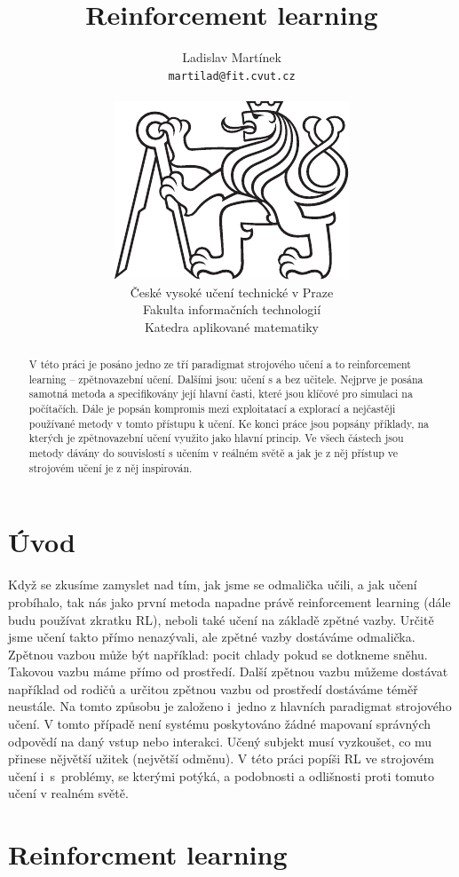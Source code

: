 \documentclass{article}
\title{Reinforcement learning}
\author{
  Ladislav Martínek\\
  \texttt{martilad@fit.cvut.cz} \\
  \\
  \includegraphics[width=.16\textwidth]{./img/cvut-logo-bw}
  \\
  České vysoké učení technické v Praze\\
  Fakulta informačních technologií\\
  Katedra aplikované matematiky\\  
}
\begin{document}
\maketitle

\begin{abstract}
V této práci je posáno jedno ze tří paradigmat strojového učení a to reinforcement learning -- zpětnovazební učení. Dalšími jsou: učení s a bez učitele. Nejprve je posána samotná metoda a specifikovány její hlavní časti, které jsou klíčové pro simulaci na počítačích. Dále je popsán kompromis mezi exploitatací a explorací a nejčastěji používané metody v tomto přístupu k učení. Ke konci práce jsou popsány příklady, na kterých je zpětnovazební učení využito jako hlavní princip. Ve všech částech jsou metody dávány do souvislostí s učením v reálném světě a jak je z něj přístup ve strojovém učení je z něj inspirován.
\end{abstract}




\section{Úvod}
Když se zkusíme zamyslet nad tím, jak jsme se odmalička učili, a jak učení probíhalo, tak nás jako první metoda napadne právě reinforcement learning (dále budu používat zkratku RL), neboli také učení na základě zpětné vazby. Určitě jsme učení takto přímo nenazývali, ale zpětné vazby dostáváme odmalička. Zpětnou vazbou může být například: pocit chlady pokud se dotkneme sněhu. Takovou vazbu máme přímo od prostředí. Další zpětnou vazbu můžeme dostávat například od rodičů a určitou zpětnou vazbu od prostředí dostáváme téměř neustále. Na tomto způsobu je založeno i~jedno z hlavních paradigmat strojového učení. V tomto případě není systému poskytováno žádné mapovaní správných odpovědí na daný vstup nebo interakci. Učený subjekt musí vyzkoušet, co mu přinese nějvětší užitek (největší odměnu). V této práci popíši RL ve strojovém učení i~s~problémy, se kterými potýká, a podobnosti a odlišnosti proti tomuto učení v realném světě. 


\section{Reinforcment learning}
\label{sec:headings}
\end{document}
